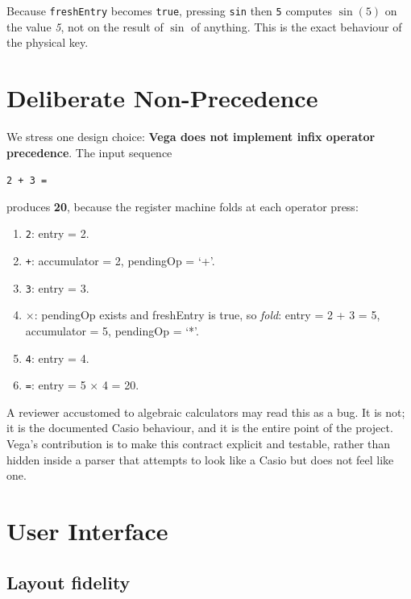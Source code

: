 \documentclass[11pt,a4paper]{article}
\begin{document}
Because \texttt{freshEntry} becomes \texttt{true}, pressing \texttt{sin} then \texttt{5} computes $\sin(5)$ on the value \emph{5}, not on the result of $\sin$ of anything. This is the exact behaviour of the physical key.

\section{Deliberate Non-Precedence}

We stress one design choice: \textbf{Vega does not implement infix operator precedence}. The input sequence

\begin{center}\texttt{2 + 3  =}\end{center}

produces \textbf{20}, because the register machine folds at each operator press:
\begin{enumerate}[leftmargin=*,itemsep=0pt]
    \item \texttt{2}: entry = 2.
    \item \texttt{+}: accumulator = 2, pendingOp = `+'.
    \item \texttt{3}: entry = 3.
    \item \texttt{$\times$}: pendingOp exists and freshEntry is true, so \emph{fold}: entry = 2 + 3 = 5, accumulator = 5, pendingOp = `*'.
    \item \texttt{4}: entry = 4.
    \item \texttt{=}: entry = 5 $\times$ 4 = 20.
\end{enumerate}

A reviewer accustomed to algebraic calculators may read this as a bug. It is not; it is the documented Casio behaviour, and it is the entire point of the project. Vega's contribution is to make this contract explicit and testable, rather than hidden inside a parser that attempts to look like a Casio but does not feel like one.

\section{User Interface}

\subsection{Layout fidelity}
\end{document}
